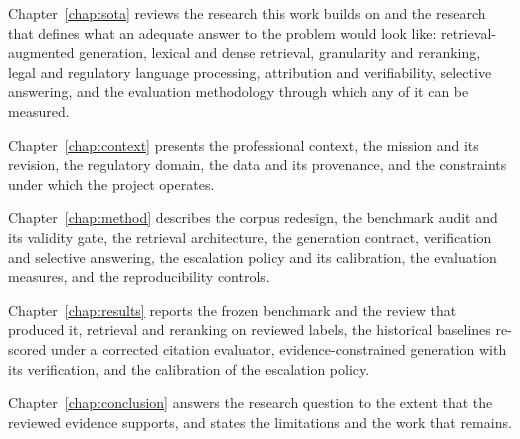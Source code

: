 Chapter~\ref{chap:sota} reviews the research this work builds on and the research that defines what an adequate answer to the problem would look like: retrieval-augmented generation, lexical and dense retrieval, granularity and reranking, legal and regulatory language processing, attribution and verifiability, selective answering, and the evaluation methodology through which any of it can be measured.

Chapter~\ref{chap:context} presents the professional context, the mission and its revision, the regulatory domain, the data and its provenance, and the constraints under which the project operates.

Chapter~\ref{chap:method} describes the corpus redesign, the benchmark audit and its validity gate, the retrieval architecture, the generation contract, verification and selective answering, the escalation policy and its calibration, the evaluation measures, and the reproducibility controls.

Chapter~\ref{chap:results} reports the frozen benchmark and the review that produced it, retrieval and reranking on reviewed labels, the historical baselines re-scored under a corrected citation evaluator, evidence-constrained generation with its verification, and the calibration of the escalation policy.

Chapter~\ref{chap:conclusion} answers the research question to the extent that the reviewed evidence supports, and states the limitations and the work that remains.

